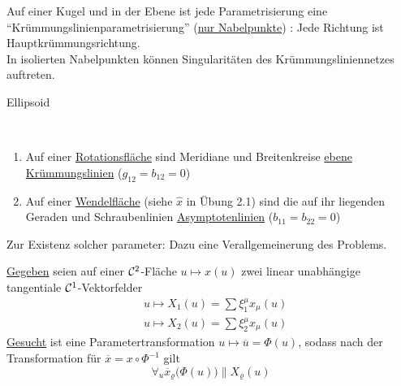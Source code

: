 \begin{bemerkung}
 Auf einer Kugel und in der Ebene ist jede Parametrisierung eine ``Krümmungslinienparametrisierung'' (\uline{nur Nabelpunkte}) : Jede Richtung ist Hauptkrümmungsrichtung. \\
 In isolierten Nabelpunkten können Singularitäten des Krümmungsliniennetzes auftreten.
 \begin{bsp}
  Ellipsoid
 \end{bsp}
\end{bemerkung}

\begin{bsp} \(\)
 \begin{enumerate}
  \item Auf einer \uline{Rotationsfläche} sind Meridiane und Breitenkreise \uline{ebene Krümmungslinien} (\(g_{12} = b_{12} = 0\))
  \item Auf einer \uline{Wendelfläche} (siehe \(\widehat x\) in Übung 2.1) sind die auf ihr liegenden Geraden und Schraubenlinien \uline{Asymptotenlinien} (\(b_{11} = b_{22} = 0\))
 \end{enumerate}

\end{bsp}

Zur Existenz solcher parameter: Dazu eine Verallgemeinerung des Problems. \par
\uline{Gegeben} seien auf einer \(\mathcal{C}^2\)-Fläche \(u \mapsto x(u)\) zwei linear unabhängige tangentiale \(\mathcal{C}^1\)-Vektorfelder
\begin{align*}
 &u \mapsto X_1(u) = \sum \xi^\mu_1 x_\mu (u) \\
 &u \mapsto X_2(u) = \sum \xi^\mu_2 x_\mu (u)
\end{align*}
\uline{Gesucht} ist eine Parametertransformation \(u \mapsto \overline u = \Phi(u)\), sodass nach der Transformation für \(\overline x = x \circ \Phi^{-1}\) gilt
\[
 \forall_u \overline x_\varrho \big(\Phi(u)\big) \parallel X_\varrho (u)
\]

